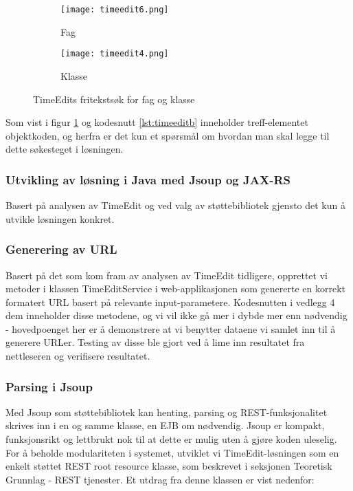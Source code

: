\documentclass[../main.tex]{subfiles}
\begin{document}
\begin{figure}[H]
  \centering
  \begin{subfigure}[b]{0.3\textwidth}
  \centering
\texttt{[image: timeedit6.png]}
\caption{Fag}
\end{subfigure}
\quad
\begin{subfigure}[b]{0.3\textwidth}
\centering
\texttt{[image: timeedit4.png]}
\caption{Klasse}
\end{subfigure}
  \caption{TimeEdits fritekstsøk for fag og klasse}
\label{fig:timeedita}
\end{figure}

Som vist i figur \ref{fig:timeedita} og kodesnutt \ref{lst:timeeditb} inneholder treff-elementet objektkoden, og herfra er det kun et spørsmål om hvordan man skal legge til dette søkesteget i løsningen.

\subsubsection{Utvikling av løsning i Java med Jsoup og JAX-RS}

Basert på analysen av TimeEdit og ved valg av støttebibliotek gjensto det kun å utvikle løsningen konkret. 

\subsubsection{Generering av URL}

Basert på det som kom fram av analysen av TimeEdit tidligere, opprettet vi metoder i klassen TimeEditService i web-applikasjonen som genererte en korrekt formatert URL basert på relevante input-parametere. Kodesnutten i vedlegg 4 dem inneholder disse metodene, og vi vil ikke gå mer i dybde mer enn nødvendig - hovedpoenget her er å demonstrere at vi benytter dataene vi samlet inn til å generere URLer. Testing av disse ble gjort ved å lime inn resultatet fra nettleseren og verifisere resultatet.

\subsubsection{Parsing i Jsoup}
Med Jsoup som støttebibliotek kan henting, parsing og REST-funksjonalitet skrives inn i en og samme klasse, en EJB om nødvendig. Jsoup er kompakt, funksjonsrikt og lettbrukt nok til at dette er mulig uten å gjøre koden uleselig. For å beholde modulariteten i systemet, utviklet vi TimeEdit-løsningen som en enkelt støttet REST root resource klasse, som beskrevet i seksjonen Teoretisk Grunnlag - REST tjenester. Et utdrag fra denne klassen er vist nedenfor:
\end{document}
